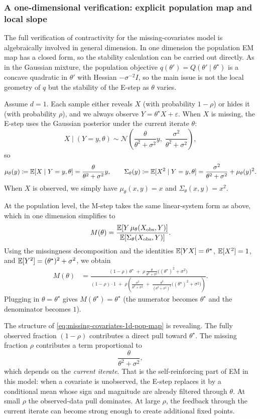 \documentclass[11pt]{article}
\begin{document}
\subsubsection{A one-dimensional verification: explicit population map and local slope}
\label{subsubsec:missing-covariates-1d-check}

The full verification of contractivity for the missing-covariates model is algebraically involved in general dimension.
In one dimension the population EM map has a closed form, so the stability calculation can be carried out directly.
As in the Gaussian mixture, the population objective $q(\theta')=Q(\theta'\mid\theta^\star)$ is a concave quadratic in $\theta'$ with Hessian $-\sigma^{-2}I$, so the main issue is not the local geometry of $q$ but the stability of the E-step as $\theta$ varies.

Assume $d=1$.
Each sample either reveals $X$ (with probability $1-\rho$) or hides it (with probability $\rho$), and we always observe $Y=\theta^\star X+\varepsilon$.
When $X$ is missing, the E-step uses the Gaussian posterior under the current iterate $\theta$:
\[
X\mid (Y=y,\theta) \sim \mathcal{N}\!\left(\frac{\theta}{\theta^2+\sigma^2}y,\;\frac{\sigma^2}{\theta^2+\sigma^2}\right),
\]
so
\[
\mu_\theta(y) \coloneqq \mathbb{E}[X\mid Y=y,\theta] = \frac{\theta}{\theta^2+\sigma^2}y,
\qquad
\Sigma_\theta(y) \coloneqq \mathbb{E}[X^2\mid Y=y,\theta]
=
\frac{\sigma^2}{\theta^2+\sigma^2}+\mu_\theta(y)^2.
\]
When $X$ is observed, we simply have $\mu_\theta(x,y)=x$ and $\Sigma_\theta(x,y)=x^2$.

At the population level, the M-step takes the same linear-system form as above, which in one dimension simplifies to
\[
M(\theta)
=
\frac{\mathbb{E}\!\left[Y\,\mu_\theta(X_{\mathrm{obs}},Y)\right]}{\mathbb{E}\!\left[\Sigma_\theta(X_{\mathrm{obs}},Y)\right]}.
\]
Using the missingness decomposition and the identities
$\mathbb{E}[YX]=\theta^\star$, $\mathbb{E}[X^2]=1$, and $\mathbb{E}[Y^2]=(\theta^\star)^2+\sigma^2$, we obtain
\begin{align}
\label{eq:missing-covariates-1d-pop-map}
M(\theta)
&=
\frac{(1-\rho)\,\theta^\star
\;+\;\rho\,\frac{\theta}{\theta^2+\sigma^2}\big((\theta^\star)^2+\sigma^2\big)}
{(1-\rho)\cdot 1
\;+\;\rho\left(\frac{\sigma^2}{\theta^2+\sigma^2}
\;+\;\frac{\theta^2}{(\theta^2+\sigma^2)^2}\big((\theta^\star)^2+\sigma^2\big)\right)}.
\end{align}
Plugging in $\theta=\theta^\star$ gives $M(\theta^\star)=\theta^\star$ (the numerator becomes $\theta^\star$ and the denominator becomes $1$).

The structure of \eqref{eq:missing-covariates-1d-pop-map} is revealing.
The fully observed fraction $(1-\rho)$ contributes a direct pull toward $\theta^\star$.
The missing fraction $\rho$ contributes a term proportional to
\[
\frac{\theta}{\theta^2+\sigma^2},
\]
which depends on the \emph{current iterate}.
That is the self-reinforcing part of EM in this model:
when a covariate is unobserved, the E-step replaces it by a conditional mean whose sign and magnitude are already filtered through $\theta$.
At small $\rho$ the observed-data pull dominates.
At large $\rho$, the feedback through the current iterate can become strong enough to create additional fixed points.
\end{document}
